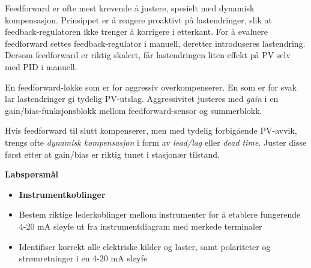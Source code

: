 \vskip 10pt

Feedforward er ofte mest krevende å justere, spesielt med dynamisk kompensasjon. Prinsippet er å reagere proaktivt på lastendringer, slik at feedback-regulatoren ikke trenger å korrigere i etterkant. For å evaluere feedforward settes feedback-regulator i manuell, deretter introduseres lastendring. Dersom feedforward er riktig skalert, får lastendringen liten effekt på PV selv med PID i manuell.

En feedforward-løkke som er for aggressiv overkompenserer. En som er for svak lar lastendringer gi tydelig PV-utslag. Aggressivitet justeres med {\it gain} i en gain/bias-funksjonsblokk mellom feedforward-sensor og summerblokk.

Hvis feedforward til slutt kompenserer, men med tydelig forbigående PV-avvik, trengs ofte {\it dynamisk kompensasjon} i form av {\it lead/lag} eller {\it dead time}. Juster disse først etter at gain/bias er riktig tunet i stasjonær tilstand.





\vfil \eject

\noindent
{\bf Labspørsmål}

\vskip 5pt

\begin{itemize}
\item{} {\bf Instrumentkoblinger}
\item{} Bestem riktige lederkoblinger mellom instrumenter for å etablere fungerende 4-20 mA sløyfe ut fra instrumentdiagram med merkede terminaler
\item{} Identifiser korrekt alle elektriske kilder og laster, samt polariteter og strømretninger i en 4-20 mA sløyfe
\end{itemize}

\filbreak

